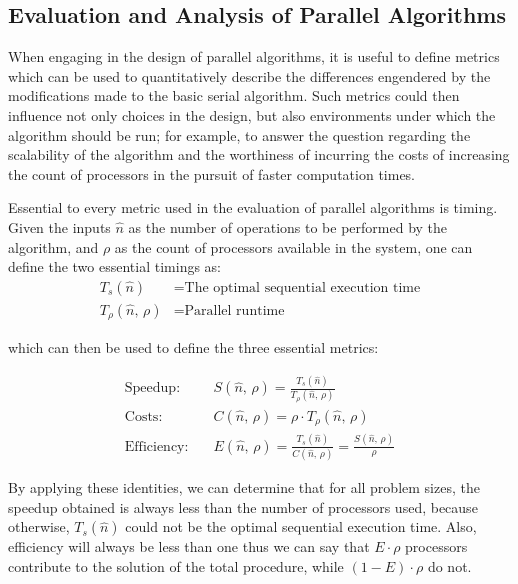 %
%
%
%
\subsection{Evaluation and Analysis of Parallel Algorithms}
\label{ch2sPPssEAPA}
When engaging in the design of parallel algorithms, it is useful to define metrics which can be used to quantitatively describe the differences engendered by the modifications made to the basic serial algorithm. Such metrics could then influence not only choices in the design, but also environments under which the algorithm should be run; for example, to answer the question regarding the scalability of the algorithm and the worthiness of incurring the costs of increasing the count of processors in the pursuit of faster computation times.~\cite[p.~330]{Lang17}

Essential to every metric used in the evaluation of parallel algorithms is timing. Given the inputs $\hat{n}$ as the number of operations to be performed by the algorithm, and $\rho$ as the count of processors available in the system, one can define the two essential timings as:
%
\begin{align}
	\mathit{T_s}(\hat{n}) &= \text{The optimal sequential execution time} \\
	\mathit{T_{\rho}}(\hat{n},\,\rho) &= \text{Parallel runtime}
	\label{eq:timings}
\end{align}

which can then be used to define the three essential metrics:

\begin{align}
	\text{Speedup:}\quad&\mathit{S}(\hat{n},\,\rho) = \frac{\mathit{T_s}(\hat{n})}{\mathit{T_{\rho}}(\hat{n},\,\rho)} \\
	\text{Costs}:\quad&\mathit{C}(\hat{n},\,\rho) =\rho\cdot\mathit{T_{\rho}}(\hat{n},\,\rho) \\
	\text{Efficiency}:\quad&\mathit{E}(\hat{n},\,\rho) = \frac{\mathit{T_s}(\hat{n})}{\mathit{C}(\hat{n},\,\rho)} = \frac{\mathit{S}(\hat{n},\,\rho)}{\rho}
	\label{eq:essentialMetrics}
\end{align}

By applying these identities, we can determine that for all problem sizes, the speedup obtained is always less than the number of processors used, because otherwise, $\mathit{T_s}(\hat{n})$ could not be the optimal sequential execution time. Also, efficiency will always be less than one thus we can say that $\mathit{E}\cdot\rho$ processors contribute to the solution of the total procedure, while $(1-\mathit{E})\cdot\rho$ do not.~\cite[p.~335]{Lang17}

